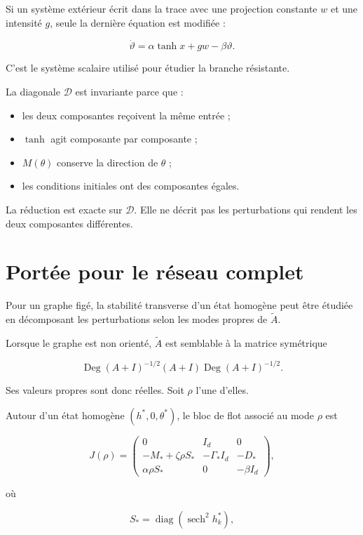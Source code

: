 Si un système extérieur écrit dans la trace avec une projection
constante \(w\) et une intensité \(g\), seule la dernière équation est
modifiée :

\[
\boxed{
\dot\vartheta
=
\alpha\tanh x
+
gw
-
\beta\vartheta.
}
\]

C'est le système scalaire utilisé pour étudier la branche résistante.

La diagonale \(\mathcal D\) est invariante parce que :

\begin{itemize}
\item
  les deux composantes reçoivent la même entrée ;
\item
  \(\tanh\) agit composante par composante ;
\item
  \(M(\theta)\) conserve la direction de \(\theta\) ;
\item
  les conditions initiales ont des composantes égales.
\end{itemize}

La réduction est exacte sur \(\mathcal D\). Elle ne décrit pas les
perturbations qui rendent les deux composantes différentes.

\section{Portée pour le réseau complet}
\label{annexe-reduction-portee-reseau}

Pour un graphe figé, la stabilité transverse d'un état homogène peut
être étudiée en décomposant les perturbations selon les modes propres
de \(\widetilde A\).

Lorsque le graphe est non orienté,
\(\widetilde A\) est semblable à la matrice symétrique

\[
\operatorname{Deg}(A+I)^{-1/2}
(A+I)
\operatorname{Deg}(A+I)^{-1/2}.
\]

Ses valeurs propres sont donc réelles. Soit \(\rho\) l'une d'elles.

Autour d'un état homogène \((h^\ast,0,\theta^\ast)\), le bloc de flot
associé au mode \(\rho\) est

\[
J(\rho)
=
\begin{pmatrix}
0&I_d&0\\
-M_\ast+\zeta\rho S_\ast
&
-\Gamma_\ast I_d
&
-D_\ast
\\
\alpha\rho S_\ast
&
0
&
-\beta I_d
\end{pmatrix},
\]

où

\[
S_\ast
=
\operatorname{diag}
\left(
\operatorname{sech}^2h_k^\ast
\right),
\]

